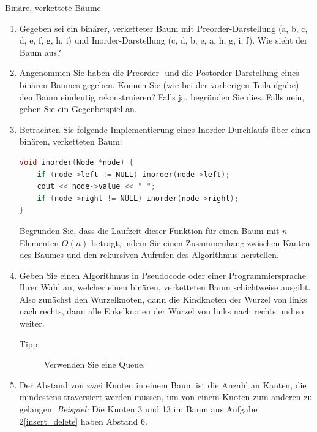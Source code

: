 \documentclass[11pt,a4paper]{article}
\begin{document}
\thispagestyle{empty}





\begin{aufgabe}{1}{Binäre, verkettete Bäume}
    \begin{enumerate}
        \item Gegeben sei ein binärer, verketteter Baum mit Preorder-Darstellung (a, b, c, d, e, f, g, h, i) und Inorder-Darstellung (c, d, b, e, a, h, g, i, f).
        Wie sieht der Baum aus?
        \item Angenommen Sie haben die Preorder- und die Postorder-Darstellung eines binären Baumes gegeben.
        Können Sie (wie bei der vorherigen Teilaufgabe) den Baum eindeutig rekonstruieren?
        Falls ja, begründen Sie dies.
        Falls nein, geben Sie ein Gegenbeispiel an.
        \item Betrachten Sie folgende Implementierung eines Inorder-Durchlaufs über einen binären, verketteten Baum:
        \begin{lstlisting}[language=c++]
void inorder(Node *node) {
    if (node->left != NULL) inorder(node->left);
    cout << node->value << " ";
    if (node->right != NULL) inorder(node->right);
}
        \end{lstlisting}
        Begründen Sie, dass die Laufzeit dieser Funktion für einen Baum mit $n$ Elementen $O(n)$ beträgt, indem Sie einen Zusammenhang zwischen Kanten des Baumes und den rekursiven Aufrufen des Algorithmus herstellen.   
        \item 
        Geben Sie einen Algorithmus in Pseudocode oder einer Programmiersprache Ihrer Wahl an, welcher einen binären, verketteten Baum schichtweise ausgibt.
        Also zunächst den Wurzelknoten, dann die Kindknoten der Wurzel von links nach rechts, dann alle Enkelknoten der Wurzel von links nach rechts und so weiter.
        \begin{description}
            \item[Tipp:] Verwenden Sie eine Queue.
        \end{description}
        \item
        Der Abstand von zwei Knoten in einem Baum ist die Anzahl an Kanten, die mindestens traversiert werden müssen, um von einem Knoten zum anderen zu gelangen.
        \emph{Beispiel:} Die Knoten 3 und 13 im Baum aus Aufgabe 2\ref*{insert_delete} haben Abstand 6.


\end{enumerate}
\end{aufgabe}
\end{document}
